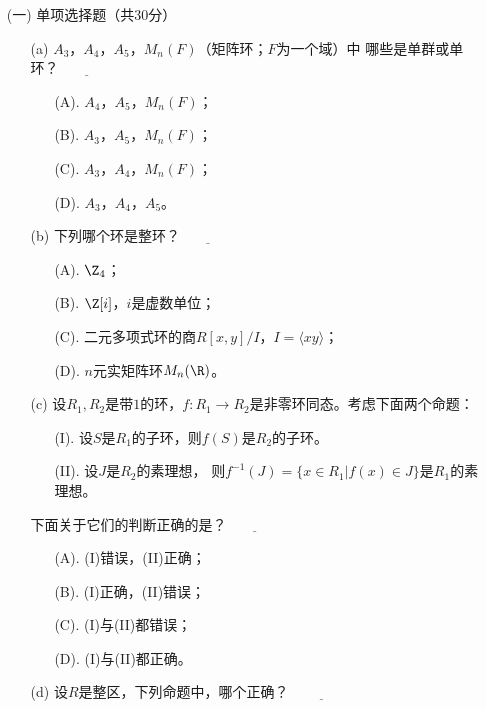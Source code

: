 \begin{itemize}
    \item[(一)]单项选择题（共30分）
    \begin{itemize}
        \item[(a)]$A_3$，$A_4$，$A_5$，$M_n(F)$（矩阵环；$F$为一个域）中
        哪些是单群或单环？\  $\underline{\qquad\quad}$
        \begin{itemize}
            \item[(A).]$A_4$，$A_5$，$M_n(F)$；
            \item[(B).]$A_3$，$A_5$，$M_n(F)$；
            \item[(C).]$A_3$，$A_4$，$M_n(F)$；
            \item[(D).]$A_3$，$A_4$，$A_5$。
        \end{itemize}
        \item[(b)]下列哪个环是整环？\  $\underline{\qquad\quad}$
        \begin{itemize}
            \item[(A).]$\Z_4$；
            \item[(B).]$\Z[i]$，$i$是虚数单位；
            \item[(C).]二元多项式环的商$R[x,y]/I$，$I=\langle xy\rangle$；
            \item[(D).]$n$元实矩阵环$M_n(\R)$。
        \end{itemize}
        \item[(c)]设$R_1,R_2$是带$1$的环，$f:R_1\to R_2$是非零环同态。考虑下面两个命题：
        \begin{itemize}
            \item[(I).]设$S$是$R_1$的子环，则$f(S)$是$R_2$的子环。
            \item[(II).]设$J$是$R_2$的素理想，
            则$f^{-1}(J)=\{x\in R_1|f(x)\in J\}$是$R_1$的素理想。
        \end{itemize}
        下面关于它们的判断$\textbf{正确}$的是？\  $\underline{\qquad\quad}$
        \begin{itemize}
            \item[(A).](I)错误，(II)正确；
            \item[(B).](I)正确，(II)错误；
            \item[(C).](I)与(II)都错误；
            \item[(D).](I)与(II)都正确。
        \end{itemize}
        \item[(d)]设$R$是整区，下列命题中，哪个$\textbf{正确}$？ \ $\underline{\qquad\quad}$

\end{itemize}
\end{itemize}
